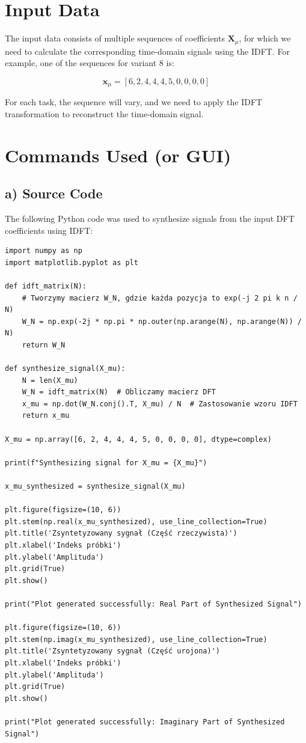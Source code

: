 \documentclass[12pt]{article}
\begin{document}
\section{Input Data}

The input data consists of multiple sequences of coefficients \( \mathbf{X}_\mu \), for which we need to calculate the corresponding time-domain signals using the IDFT. For example, one of the sequences for variant 8 is:

\[
\mathbf{x}_\mu = [6, 2, 4, 4, 4,5,0, 0, 0, 0]
\]

For each task, the sequence will vary, and we need to apply the IDFT transformation to reconstruct the time-domain signal.

\section{Commands Used (or GUI)}

\subsection{a) Source Code}

The following Python code was used to synthesize signals from the input DFT coefficients using IDFT:

\begin{verbatim}
import numpy as np
import matplotlib.pyplot as plt

def idft_matrix(N):
    # Tworzymy macierz W_N, gdzie każda pozycja to exp(-j 2 pi k n / N)
    W_N = np.exp(-2j * np.pi * np.outer(np.arange(N), np.arange(N)) / N)
    return W_N

def synthesize_signal(X_mu):
    N = len(X_mu)
    W_N = idft_matrix(N)  # Obliczamy macierz DFT
    x_mu = np.dot(W_N.conj().T, X_mu) / N  # Zastosowanie wzoru IDFT
    return x_mu

X_mu = np.array([6, 2, 4, 4, 4, 5, 0, 0, 0, 0], dtype=complex)

print(f"Synthesizing signal for X_mu = {X_mu}")

x_mu_synthesized = synthesize_signal(X_mu)

plt.figure(figsize=(10, 6))
plt.stem(np.real(x_mu_synthesized), use_line_collection=True)
plt.title('Zsyntetyzowany sygnał (Część rzeczywista)')
plt.xlabel('Indeks próbki')
plt.ylabel('Amplituda')
plt.grid(True)
plt.show()

print("Plot generated successfully: Real Part of Synthesized Signal")

plt.figure(figsize=(10, 6))
plt.stem(np.imag(x_mu_synthesized), use_line_collection=True)
plt.title('Zsyntetyzowany sygnał (Część urojona)')
plt.xlabel('Indeks próbki')
plt.ylabel('Amplituda')
plt.grid(True)
plt.show()

print("Plot generated successfully: Imaginary Part of Synthesized Signal")

\end{verbatim}
\end{document}

